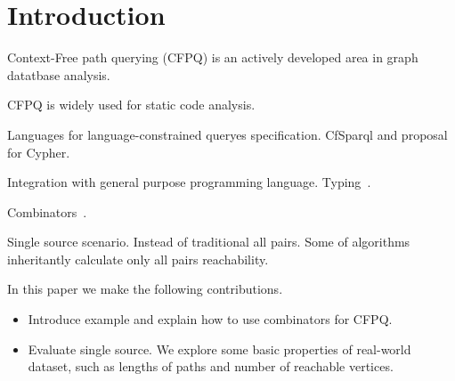 \section{Introduction}

Context-Free path querying (CFPQ) is an actively developed area in graph datatbase analysis.

CFPQ is widely used for static code analysis.

Languages for language-constrained queryes specification.
CfSparql and proposal for Cypher.

Integration with general purpose programming language. Typing~\cite{10.1145/2076623.2076653}.

Combinators~\cite{10.1145/3241653.3241655}.

Single source scenario.
Instead of traditional all pairs.
Some of algorithms inheritantly calculate only all pairs reachability. 

In this paper we make the following contributions.
\begin{itemize}
  \item Introduce example and explain how to use combinators for CFPQ.
  \item Evaluate single source. We explore some basic properties of real-world dataset, such as lengths of paths and number of reachable vertices.
\end{itemize}
